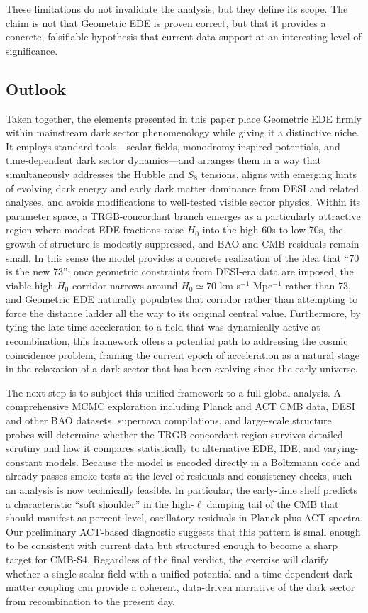 \documentclass[a4paper,11pt]{article}
\begin{document}
These limitations do not invalidate the analysis, but they define its scope. The claim is not that Geometric EDE is proven correct, but that it provides a concrete, falsifiable hypothesis that current data support at an interesting level of significance.

\subsection*{Outlook}
\label{sec:outlook}

Taken together, the elements presented in this paper place Geometric EDE firmly within mainstream dark sector phenomenology while giving it a distinctive niche. It employs standard tools---scalar fields, monodromy-inspired potentials, and time-dependent dark sector dynamics---and arranges them in a way that simultaneously addresses the Hubble and $S_8$ tensions, aligns with emerging hints of evolving dark energy and early dark matter dominance from DESI and related analyses, and avoids modifications to well-tested visible sector physics. Within its parameter space, a TRGB-concordant branch emerges as a particularly attractive region where modest EDE fractions raise $H_0$ into the high 60s to low 70s, the growth of structure is modestly suppressed, and BAO and CMB residuals remain small. In this sense the model provides a concrete realization of the idea that ``70 is the new 73'': once geometric constraints from DESI-era data are imposed, the viable high-$H_0$ corridor narrows around $H_0 \simeq 70$ km s$^{-1}$ Mpc$^{-1}$ rather than 73, and Geometric EDE naturally populates that corridor rather than attempting to force the distance ladder all the way to its original central value. Furthermore, by tying the late-time acceleration to a field that was dynamically active at recombination, this framework offers a potential path to addressing the cosmic coincidence problem, framing the current epoch of acceleration as a natural stage in the relaxation of a dark sector that has been evolving since the early universe.

The next step is to subject this unified framework to a full global analysis. A comprehensive MCMC exploration including Planck and ACT CMB data, DESI and other BAO datasets, supernova compilations, and large-scale structure probes will determine whether the TRGB-concordant region survives detailed scrutiny and how it compares statistically to alternative EDE, IDE, and varying-constant models. Because the model is encoded directly in a Boltzmann code and already passes smoke tests at the level of residuals and consistency checks, such an analysis is now technically feasible. In particular, the early-time shelf predicts a characteristic ``soft shoulder'' in the high-$\ell$ damping tail of the CMB that should manifest as percent-level, oscillatory residuals in Planck plus ACT spectra. Our preliminary ACT-based diagnostic suggests that this pattern is small enough to be consistent with current data but structured enough to become a sharp target for CMB-S4. Regardless of the final verdict, the exercise will clarify whether a single scalar field with a unified potential and a time-dependent dark matter coupling can provide a coherent, data-driven narrative of the dark sector from recombination to the present day.
\end{document}
